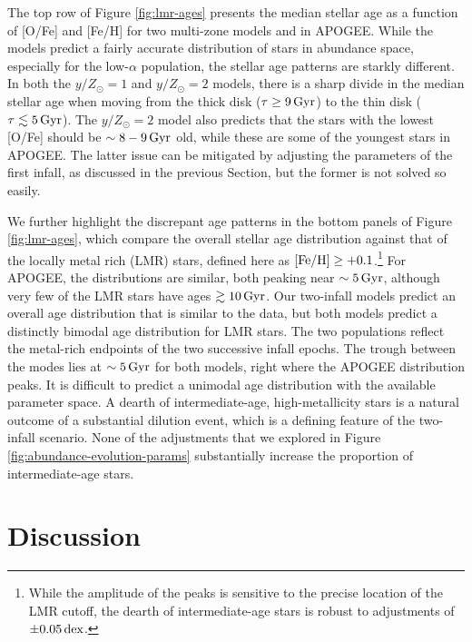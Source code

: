 \documentclass[twocolumn,twocolappendix,linenumbers]{aastex631}
\newcommand{\todo}[1]{{\color{red}#1}}
\newcommand{\mathFeH}{{\rm [Fe/H]}}
\newcommand{\yZ}[1]{$y/Z_\odot=#1$}
\newcommand{\Gyr}{\,{\rm Gyr}}
\newcommand{\dex}{\,{\rm dex}}
\begin{document}
The top row of Figure \ref{fig:lmr-ages} presents the median stellar age as a function of [O/Fe] and [Fe/H] for two multi-zone models and in APOGEE. While the models predict a fairly accurate distribution of stars in abundance space, especially for the low-$\alpha$ population, the stellar age patterns are starkly different. In both the \yZ{1} and \yZ{2} models, there is a sharp divide in the median stellar age when moving from the thick disk ($\tau\ge9\Gyr$) to the thin disk ($\tau\lesssim5\Gyr$). The \yZ{2} model also predicts that the stars with the lowest [O/Fe] should be $\sim8-9\Gyr$ old, while these are some of the youngest stars in APOGEE. The latter issue can be mitigated by adjusting the parameters of the first infall, as discussed in the previous Section, but the former is not solved so easily.

We further highlight the discrepant age patterns in the bottom panels of Figure \ref{fig:lmr-ages}, which compare the overall stellar age distribution against that of the locally metal rich (LMR) stars, defined here as $\mathFeH\ge+0.1$.\footnote{
    While the amplitude of the peaks is sensitive to the precise location of the LMR cutoff, the dearth of intermediate-age stars is robust to adjustments of $\pm0.05\dex$.
} For APOGEE, the distributions are similar, both peaking near $\sim5\Gyr$, although very few of the LMR stars have ages $\gtrsim10\Gyr$. Our two-infall models predict an overall age distribution that is similar to the data, but both models predict a distinctly bimodal age distribution for LMR stars. The two populations reflect the metal-rich endpoints of the two successive infall epochs. The trough between the modes lies at $\sim5\Gyr$ for both models, right where the APOGEE distribution peaks. It is difficult to predict a unimodal age distribution with the available parameter space. A dearth of intermediate-age, high-metallicity stars is a natural outcome of a substantial dilution event, which is a defining feature of the two-infall scenario. None of the adjustments that we explored in Figure \ref{fig:abundance-evolution-params} substantially increase the proportion of intermediate-age stars.

\section{Discussion}
\label{sec:discussion}

\end{document}

